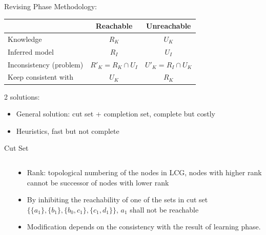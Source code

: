 \documentclass[8pt]{beamer}
\begin{document}
\begin{frame}{Revising Phase}
    Methodology:
    
    \begin{center}
        \begin{tabular}{l|c|c}
        &Reachable &Unreachable\\
        \hline
        Knowledge& $R_K$ & $U_K$ \pause\\
        \hline
        Inferred model& $R_I$ & $U_I$\pause\\
        \hline
        Inconsistency (problem)& $R'_K=R_K\cap U_I$ & $U'_K=R_I\cap U_K$\pause\\
        Keep consistent with& $U_K$& $R_K$ \pause
    \end{tabular} 
    \end{center}
2 solutions:
\begin{itemize}
    \item General solution: cut set + completion set, complete but costly
    \item Heuristics, fast but not complete
\end{itemize}
\end{frame}

\begin{frame}{Cut Set}
    
    
    \vspace{0.5cm}
\begin{columns}
\begin{column}{0.6\textwidth}
    
\end{column}
\begin{column}{0.4\textwidth}
\begin{itemize}
    \item Rank: topological numbering of the nodes in LCG, nodes with higher rank cannot be successor of nodes with lower rank
    \item By inhibiting the reachability of one of the sets in cut set $\{\{a_1\},\{b_1\},\{b_0,c_1\},\{c_1,d_1\}\}$, $a_1$ shall not be reachable
    \item Modification depends on the consistency with the result of learning phase.
\end{itemize}



\end{column}
\end{columns}    
\end{frame}
 
\end{document}
